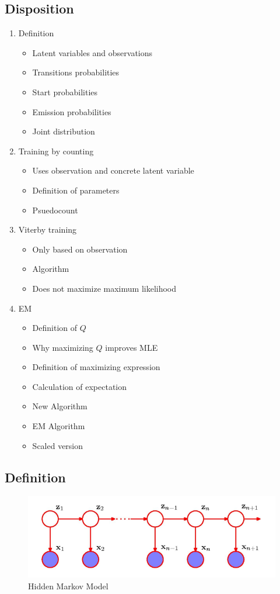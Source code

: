 \documentclass[a4, english]{article}
\begin{document}
\subsection{Disposition}
\begin{enumerate}
	\item Definition
  \begin{itemize}
  	\item Latent variables and observations
    \item Transitions probabilities
    \item Start probabilities 
    \item Emission probabilities
    \item Joint distribution
  \end{itemize}
  \item Training by counting
  \begin{itemize}
    \item Uses observation and concrete latent variable
    \item Definition of parameters
    \item Psuedocount
  \end{itemize}
  \item Viterby training
  \begin{itemize}
  	\item Only based on observation
    \item Algorithm
    \item Does not maximize maximum likelihood 
  \end{itemize}
  \item EM
  \begin{itemize}
  	\item Definition of $Q$ 
    \item Why maximizing $Q$ improves MLE
    \item Definition of maximizing expression 
    \item Calculation of expectation
    \item New Algorithm
    \item EM Algorithm
    \item Scaled version
  \end{itemize}
\end{enumerate}
\newpage

\subsection{Definition}
\begin{figure}[h]
	\centering
	\includegraphics[width=\linewidth]{img/markov_diagram}
	\caption{Hidden Markov Model \label{hidden_diagram2}}
\end{figure}
\end{document}
